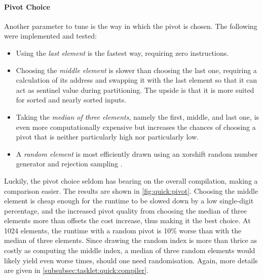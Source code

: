 \paragraph{Pivot Choice}
Another parameter to tune is the way in which the pivot is chosen.
The following were implemented and tested:
\begin{itemize}
	\item
	Using the \emph{last element} is the fastest way, requiring zero instructions.

	\item
	Choosing the \emph{middle element} is slower than choosing the last one, requiring a calculation of its address and swapping it with the last element so that it can act as sentinel value during partitioning.
	The upside is that it is more suited for sorted and nearly sorted inputs.

	\item
	Taking the \emph{median of three elements}, namely the first, middle, and last one, is even more computationally expensive but increases the chances of choosing a pivot that is neither particularly high nor particularly low.

	\item
	A \emph{random element} is most efficiently drawn using an xorshift random number generator and rejection sampling \cite{lukas_geis}.
\end{itemize}
Luckily, the pivot choice seldom has bearing on the overall compilation, making a comparison easier.
The results are shown in \cref{fig:quick:pivot}.
Choosing the middle element is cheap enough for the runtime to be slowed down by a low single-digit percentage, and the increased pivot quality from choosing the median of three elements more than offsets the cost increase, thus making it the best choice.
At 1024 elements, the runtime with a random pivot is 10\% worse than with the median of three elements.
Since drawing the random index is more than thrice as costly as computing the middle index, a median of three random elements would likely yield even worse times, should one need randomisation.
Again, more details are given in \cref{subsubsec:tasklet:quick:compiler}.

